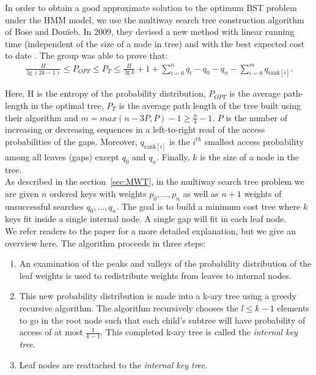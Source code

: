 \documentclass[letterpaper,12pt,titlepage,oneside,final]{book}
\theoremstyle{plain}
\begin{document}
In order to obtain a good approximate solution to the optimum BST problem under the HMM model, we use the multiway search tree construction algorithm of Bose and Dou\"{i}eb. In 2009, they devised a new method with linear running time (independent of the size of a node in tree) and with the best expected cost to date \cite{bose2009efficient}. The group was able to prove that:
\begin{align*}
\frac{H}{\lg(2k-1)} \leq P_{OPT} \leq P_T \leq \frac{H}{\lg k} + 1 + \sum_{i=0}^n q_i - q_0 - q_n - \sum_{i=0}^m q_{\text{rank}[i]}.
\end{align*}

Here, H is the entropy of the probability distribution, $P_{OPT}$ is the average path-length in the optimal tree, $P_T$ is the average path length of the tree built using their algorithm and $m=max({n-3P,P})-1 \geq \frac{n}{4} - 1$. $P$ is the number of increasing or decreasing sequences in a left-to-right read of the access probabilities of the gaps. Moreover, $q_{\text{rank}[i]}$ is the $i^{th}$ smallest access probability among all leaves (gaps) except $q_0$ and $q_n$. Finally, $k$ is the size of a node in the tree. \\

As described in the section~\ref{sec:MWT}, in the multiway search tree problem we are given $n$ ordered keys with weights $p_0, ..., p_n$ as well as $n+1$ weights of unsuccessful searches $q_0,...,q_n$. The goal is to build a minimum cost tree where $k$ keys fit inside a single internal node. A single gap will fit in each leaf node. \\
 
We refer readers to the paper \cite{bose2009efficient} for a more detailed explanation, but we give an overview here. The algorithm proceeds in three steps: 
 
\begin{enumerate}
\item An examination of the peaks and valleys of the probability distribution of the leaf weights is used to redistribute weights from leaves to internal nodes. 

\item This new probability distribution is made into a k-ary tree using a greedy recursive algorithm. The algorithm recursively chooses the $l \leq k-1$ elements to go in the root node such that each child's subtree will have probability of access of at most $\frac{1}{k-1}$. This completed k-ary tree is called the \textit{internal key tree}. 

\item Leaf nodes are reattached to the \textit{internal key tree}.
\end{enumerate}
\end{document}
